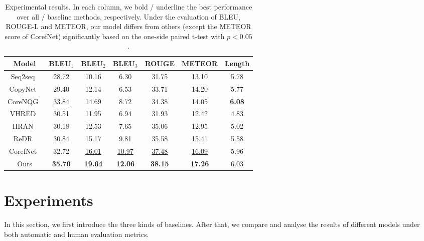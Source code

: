 \documentclass[11pt,a4paper]{article}
\begin{document}
\begin{table*}[t!]
	\centering
	\begin{tabular}{c|ccc|cc|c}
		\hline
		Model                                 & BLEU$_1$          & BLEU$_2$          & BLEU$_3$          & ROUGE         & METEOR            & Length                    \\ \hline
		Seq2seq~\cite{du2017learning}         & 28.72             & 10.16             & 6.30              & 31.75             & 13.10             & 5.78                      \\
		CopyNet~\cite{see2017get}             & 29.40             & 12.14             & 6.53              & 33.71             & 14.20             & 5.77                      \\
		CoreNQG~\cite{du2018harvesting}      & \underline{33.84} & 14.69             & 8.72              & 34.38             & 14.05             & \underline{\textbf{6.08}} \\ \hline
		VHRED~\cite{serban2017hierarchical}   & 30.51             & 11.95             & 6.94              & 31.93             & 12.42             & 4.83                      \\
		HRAN~\cite{xing2018hierarchical}      & 30.18             & 12.53             & 7.65              & 35.06             & 12.95             & 5.02                      \\ \hline
		ReDR~\cite{pan2019reinforced}         & 30.84             & 15.17             & 9.81             & 35.58             & 15.41             & 5.58                      \\
		CorefNet~\cite{gao2019interconnected} & 32.72             & \underline{16.01} & \underline{10.97} & \underline{37.48} & \underline{16.09} & 5.96                      \\ \hline
		Ours                                  & \textbf{35.70}    & \textbf{19.64}    & \textbf{12.06}    & \textbf{38.15}    & \textbf{17.26}    & 6.03                      \\ \hline
	\end{tabular}
	\caption{Experimental results. In each column, we bold / underline the best performance over all / baseline methods, respectively. Under the evaluation of BLEU, ROUGE-L and METEOR, our model differs from others (except the METEOR score of CorefNet) significantly based on the one-side paired t-test with $p < 0.05$.}
	\label{Tab:Results}
\end{table*}

\section{Experiments}
In this section, we first introduce the three kinds of baselines. After that, we compare and analyse the results of different models under both automatic and human evaluation metrics.
\end{document}
